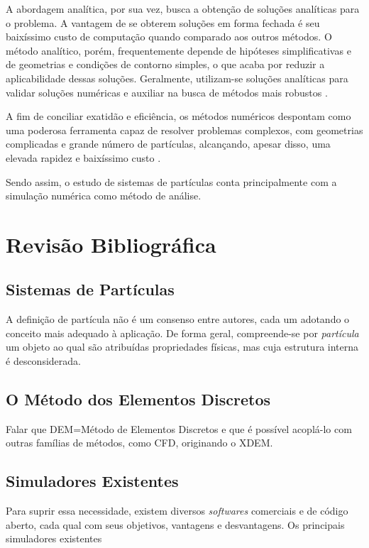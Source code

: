 A abordagem analítica, por sua vez, busca a obtenção de soluções analíticas para o problema. A vantagem de se obterem soluções em forma fechada é seu baixíssimo custo de computação quando comparado aos outros métodos. O método analítico, porém, frequentemente depende de hipóteses simplificativas e de geometrias e condições de contorno simples, o que acaba por reduzir a aplicabilidade dessas soluções. Geralmente, utilizam-se soluções analíticas para validar soluções numéricas e auxiliar na busca de métodos mais robustos .

A fim de conciliar exatidão e eficiência, os métodos numéricos despontam como uma poderosa ferramenta capaz de resolver problemas complexos, com geometrias complicadas e grande número de partículas, alcançando, apesar disso, uma elevada rapidez e baixíssimo custo .

Sendo assim, o estudo de sistemas de partículas conta principalmente com a simulação numérica como método de análise.

\section{Revisão Bibliográfica}
 
\subsection{Sistemas de Partículas}

A definição de partícula não é um consenso entre autores, cada um adotando o conceito mais adequado à aplicação. De forma geral, compreende-se por \textit{partícula} um objeto ao qual são atribuídas propriedades físicas, mas cuja estrutura interna é desconsiderada.

\subsection{O Método dos Elementos Discretos}
\alert{Falar que DEM=Método de Elementos Discretos e que é possível acoplá-lo com outras famílias de métodos, como CFD, originando o XDEM.}

\subsection{Simuladores Existentes}

Para suprir essa necessidade, existem diversos \textit{softwares} comerciais e de código aberto, cada qual com seus objetivos, vantagens e desvantagens. Os principais simuladores existentes

